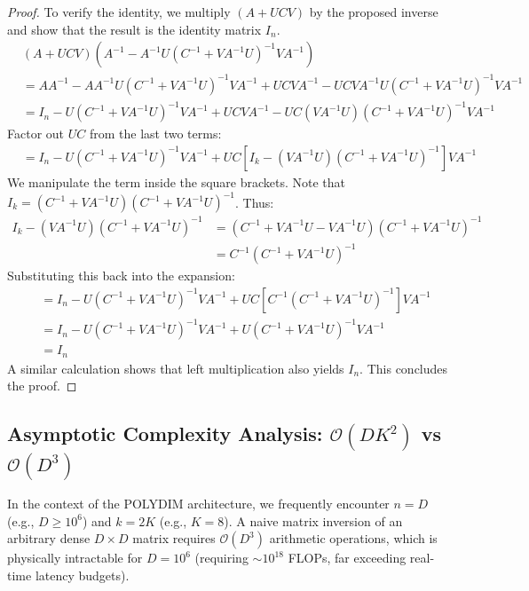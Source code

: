 \begin{proof}
To verify the identity, we multiply $(A + UCV)$ by the proposed inverse and show that the result is the identity matrix $I_n$.
\begin{align*}
& (A + UCV) \left( A^{-1} - A^{-1}U(C^{-1} + VA^{-1}U)^{-1}VA^{-1} \right) \\
&= A A^{-1} - A A^{-1}U(C^{-1} + VA^{-1}U)^{-1}VA^{-1} + UCV A^{-1} - UCV A^{-1}U(C^{-1} + VA^{-1}U)^{-1}VA^{-1} \\
&= I_n - U(C^{-1} + VA^{-1}U)^{-1}VA^{-1} + UCV A^{-1} - UC(V A^{-1}U)(C^{-1} + VA^{-1}U)^{-1}VA^{-1}
\end{align*}
Factor out $UC$ from the last two terms:
\begin{align*}
&= I_n - U(C^{-1} + VA^{-1}U)^{-1}VA^{-1} + UC \left[ I_k - (VA^{-1}U)(C^{-1} + VA^{-1}U)^{-1} \right] VA^{-1}
\end{align*}
We manipulate the term inside the square brackets. Note that $I_k = (C^{-1} + VA^{-1}U)(C^{-1} + VA^{-1}U)^{-1}$. Thus:
\begin{align*}
I_k - (VA^{-1}U)(C^{-1} + VA^{-1}U)^{-1} &= (C^{-1} + VA^{-1}U - VA^{-1}U)(C^{-1} + VA^{-1}U)^{-1} \\
&= C^{-1}(C^{-1} + VA^{-1}U)^{-1}
\end{align*}
Substituting this back into the expansion:
\begin{align*}
&= I_n - U(C^{-1} + VA^{-1}U)^{-1}VA^{-1} + UC \left[ C^{-1}(C^{-1} + VA^{-1}U)^{-1} \right] VA^{-1} \\
&= I_n - U(C^{-1} + VA^{-1}U)^{-1}VA^{-1} + U(C^{-1} + VA^{-1}U)^{-1}VA^{-1} \\
&= I_n
\end{align*}
A similar calculation shows that left multiplication also yields $I_n$. This concludes the proof.
\end{proof}

\subsection{Asymptotic Complexity Analysis: $\mathcal{O}(DK^2)$ vs $\mathcal{O}(D^3)$}

In the context of the POLYDIM architecture, we frequently encounter $n = D$ (e.g., $D \ge 10^6$) and $k = 2K$ (e.g., $K = 8$). A naive matrix inversion of an arbitrary dense $D \times D$ matrix requires $\mathcal{O}(D^3)$ arithmetic operations, which is physically intractable for $D = 10^6$ (requiring $\sim 10^{18}$ FLOPs, far exceeding real-time latency budgets).


